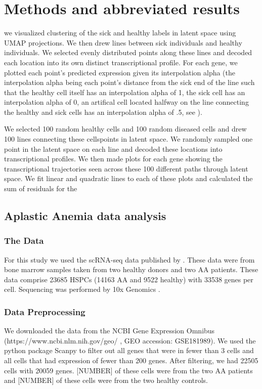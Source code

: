 \documentclass{article}
\begin{document}
\section{Methods and abbreviated results}

we visualized clustering of the sick and healthy labels in latent space using UMAP projections.
We then drew lines between sick individuals and healthy individuals.
We selected evenly distributed points along these lines and decoded each location into its own distinct transcriptional profile.
For each gene, we plotted each point's predicted expression given its interpolation alpha (the interpolation alpha being each point's distance from the sick end of the line such that the healthy cell itself has an interpolation alpha of 1, the sick cell has an interpolation alpha of 0, an artifical cell located halfway on the line connecting the healthy and sick cells has an interpolation alpha of .5, see ).

We selected 100 random healthy cells and 100 random diseased cells and drew 100 lines connecting these cells\textquotesingle points in latent space.
We randomly sampled one point in the latent space on each line and decoded these locations into transcriptional profiles.
We then made plots for each gene showing the transcriptional trajectories seen across these 100 different paths through latent space.
We fit linear and quadratic lines to each of these plots and calculated the sum of residuals for the 

\subsection{Aplastic Anemia data analysis}

\subsubsection{The Data}
For this study we used the scRNA-seq data published by \citet{tonglin_single-cell_2022}.
These data were from bone marrow samples taken from two healthy donors and two AA patients.
These data comprise 23685 HSPCs (14163 AA and 9522 healthy) with 33538 genes per cell.
Sequencing was performed by 10x Genomics \citep{10X_genomics}.

\subsubsection{Data Preprocessing}
We downloaded the data from the NCBI Gene Expression Omnibus (https://www.ncbi.nlm.nih.gov/geo/ , GEO accession: GSE181989).
We used the python package Scanpy \citep{wolf_scanpy_2018} to filter out all genes that were in fewer than 3 cells and all cells that had expression of fewer than 200 genes.
After filtering, we had 22505 cells with 20059 genes.
[NUMBER] of these cells were from the two AA patients and [NUMBER] of these cells were from the two healthy controls.
\end{document}
